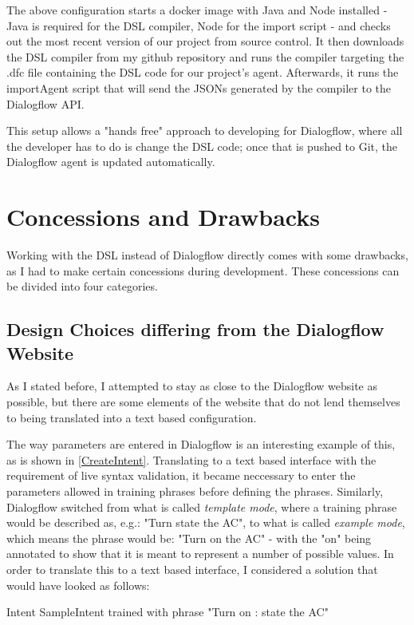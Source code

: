 The above configuration starts a docker image with Java and Node installed - Java is required for the DSL compiler, Node for the import script - and checks out the most recent version of our project from source control.
It then downloads the DSL compiler from my github repository and runs the compiler targeting the .dfc file containing the DSL code for our project's agent.
Afterwards, it runs the importAgent script that will send the JSONs generated by the compiler to the Dialogflow API.

This setup allows a "hands free" approach to developing for Dialogflow, where all the developer has to do is change the DSL code; once that is pushed to Git, the Dialogflow agent is updated automatically.


\section{Concessions and Drawbacks}

Working with the DSL instead of Dialogflow directly comes with some drawbacks, as I had to make certain concessions during development. 
These concessions can be divided into four categories.

\subsection{Design Choices differing from the Dialogflow Website}
As I stated before, I attempted to stay as close to the Dialogflow website as possible, but there are some elements of the website that do not lend themselves to being translated into a text based configuration.

The way parameters are entered in Dialogflow is an interesting example of this, as is shown in \autoref{CreateIntent}. Translating to a text based interface with the requirement of live syntax validation, it became neccessary to enter the parameters allowed in training phrases before defining the phrases.
Similarly, Dialogflow switched from what is called \textit{template mode}, where a training phrase would be described as, e.g.: "Turn state the AC", to what is called \textit{example mode}, which means the phrase would be: "Turn on the AC" - with the "on" being annotated to show that it is meant to represent a number of possible values.
In order to translate this to a text based interface, I considered a solution that would have looked as follows:

\begin{DSL}
    Intent SampleIntent
        trained with phrase
            "Turn {on : state} the AC"
\end{DSL}

